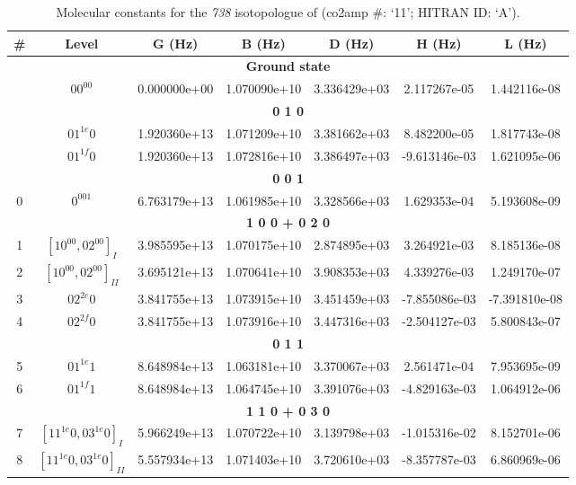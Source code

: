 \begin{table}[h!]
\caption{Molecular constants for the \textit{738} isotopologue of  (co2amp \#: ‘11’; HITRAN ID: ‘A’).}
\label{table:constants_738}
\centering
\begin{tabular}{|c|c|c|c|c|c|c|}
\hline
\textbf{\#} & \textbf{Level} & \textbf{G (Hz)} & \textbf{B (Hz)} & \textbf{D (Hz)} & \textbf{H (Hz)} & \textbf{L (Hz)} \\ \hline
\multicolumn{7}{|c|}{\textbf{Ground state}} \\ \hline
 & $00^00$ & 0.000000e+00 & 1.070090e+10 & 3.336429e+03 & 2.117267e-05 & 1.442116e-08 \\ \hline
\multicolumn{7}{|c|}{\textbf{0 1 0}} \\ \hline
 & $01^{1e}0$ & 1.920360e+13 & 1.071209e+10 & 3.381662e+03 & 8.482200e-05 & 1.817743e-08 \\ \hline
 & $01^{1f}0$ & 1.920360e+13 & 1.072816e+10 & 3.386497e+03 & -9.613146e-03 & 1.621095e-06 \\ \hline
\multicolumn{7}{|c|}{\textbf{0 0 1}} \\ \hline
0 & $0^001$ & 6.763179e+13 & 1.061985e+10 & 3.328566e+03 & 1.629353e-04 & 5.193608e-09 \\ \hline
\multicolumn{7}{|c|}{\textbf{1 0 0 + 0 2 0}} \\ \hline
1 & $[10^00, 02^00]_{I}$ & 3.985595e+13 & 1.070175e+10 & 2.874895e+03 & 3.264921e-03 & 8.185136e-08 \\ \hline
2 & $[10^00, 02^00]_{II}$ & 3.695121e+13 & 1.070641e+10 & 3.908353e+03 & 4.339276e-03 & 1.249170e-07 \\ \hline
3 & $02^{2e}0$ & 3.841755e+13 & 1.073915e+10 & 3.451459e+03 & -7.855086e-03 & -7.391810e-08 \\ \hline
4 & $02^{2f}0$ & 3.841755e+13 & 1.073916e+10 & 3.447316e+03 & -2.504127e-03 & 5.800843e-07 \\ \hline
\multicolumn{7}{|c|}{\textbf{0 1 1}} \\ \hline
5 & $01^{1e}1$ & 8.648984e+13 & 1.063181e+10 & 3.370067e+03 & 2.561471e-04 & 7.953695e-09 \\ \hline
6 & $01^{1f}1$ & 8.648984e+13 & 1.064745e+10 & 3.391076e+03 & -4.829163e-03 & 1.064912e-06 \\ \hline
\multicolumn{7}{|c|}{\textbf{1 1 0 + 0 3 0}} \\ \hline
7 & $[11^{1e}0, 03^{1e}0]_{I}$ & 5.966249e+13 & 1.070722e+10 & 3.139798e+03 & -1.015316e-02 & 8.152701e-06 \\ \hline
8 & $[11^{1e}0, 03^{1e}0]_{II}$ & 5.557934e+13 & 1.071403e+10 & 3.720610e+03 & -8.357787e-03 & 6.860969e-06 \\ \hline

\end{tabular}
\end{table}
